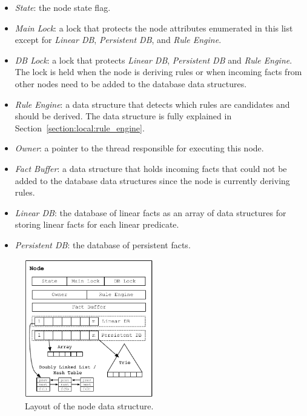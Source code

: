 \begin{itemize}
   \item \emph{State}: the node state flag.
   \item \emph{Main Lock}: a lock that protects the node attributes enumerated
      in this list except for \emph{Linear DB}, \emph{Persistent DB}, and
      \emph{Rule Engine}.
   \item \emph{DB Lock}: a lock that protects \emph{Linear DB},
      \emph{Persistent DB} and \emph{Rule Engine}. The lock is held when the node is deriving rules or
      when incoming facts from other nodes need to be added to the database data
      structures.
   \item \emph{Rule Engine}: a data structure that detects which rules are
      candidates and should be derived. The data structure is fully explained
      in Section~\ref{section:local:rule_engine}.
   \item \emph{Owner}: a pointer to the thread responsible for executing this
      node.
   \item \emph{Fact Buffer}: a data structure that holds incoming facts that
      could not be added to the database data structures since the node is
      currently deriving rules.
   \item \emph{Linear DB}: the database of linear facts as an array of data
      structures for storing linear facts for each linear predicate.
   \item \emph{Persistent DB}: the database of persistent facts.
\end{itemize}

\begin{figure}[t]
\centering
\includegraphics[width=0.5\textwidth]{figures/local/node.pdf}
\caption{Layout of the node data structure.}
\label{fig:local:node_overview}
\end{figure}


